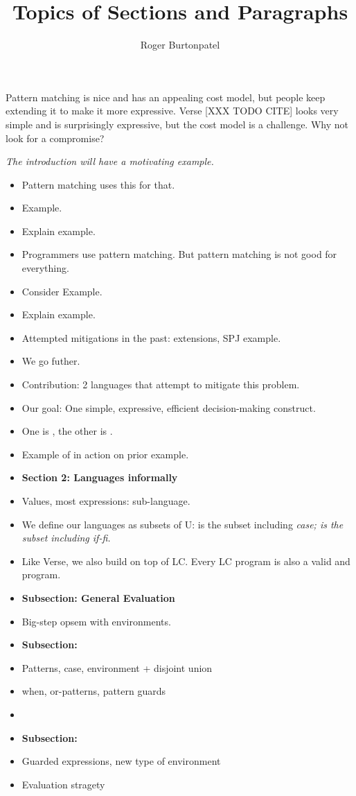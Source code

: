 \documentclass{article}
\title{Topics of Sections and Paragraphs}
\author{Roger Burtonpatel}
\begin{document}
\maketitle

Pattern matching is nice and has an appealing cost model, but people keep
extending it to make it more expressive. Verse [XXX TODO CITE] looks very simple
and is surprisingly expressive, but the cost model is a challenge. Why not look
for a compromise?

\bigskip 
\it{The introduction will have a motivating example.}
\bigskip 

\begin{itemize}
    \item Pattern matching uses this for that. 
    \item Example. 
    \item Explain example. 
    \item Programmers use pattern matching. But pattern matching is not good for
    everything. 
    \item Consider Example. 
    \item Explain example. 
    \item Attempted mitigations in the past: extensions, SPJ example. 
    \item We go futher. 
    \item Contribution: 2 languages that attempt to mitigate this problem. 
    \item Our goal: One simple, expressive, efficient decision-making construct.
    \item One is {\PPlus}, the other is {\VMinus}. 
    \item Example of {\VMinus} in action on prior example. 
    \item \bf{Section 2: Languages informally}
    \item Values, most expressions: sub-language. 
    \item We define our languages as subsets of U: {\PPlus} is the subset 
    including \it{case}; {\VMinus} is the subset including \it{if-fi}. 
    \item Like Verse, we also build on top of LC. Every LC program is also a
    valid {\PPlus} and {\VMinus} program.
    \item \bf{Subsection: General Evaluation}
    \item Big-step opsem with environments. 
    \item \bf{Subsection: {\PPlus}}
    \item Patterns, case, environment + disjoint union 
    \item when, or-patterns, pattern guards 
    \item
    \item \bf{Subsection: {\VMinus}}
    \item Guarded expressions, new type of environment
    \item Evaluation stragety 
\end{itemize}
\end{document}
